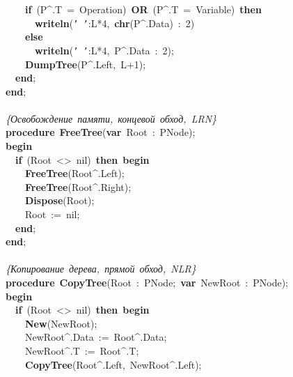 \mbox{}\ \ \ \ \textbf{if}\ (P\textasciicircum{}.T\ =\ Operation)\ \textbf{OR}\ (P\textasciicircum{}.T\ =\ Variable)\ \textbf{then} \\
\mbox{}\ \ \ \ \ \ \textbf{writeln}(\texttt{'\ '}:L*4,\ \textbf{chr}(P\textasciicircum{}.Data)\ :\ 2) \\
\mbox{}\ \ \ \ \textbf{else} \\
\mbox{}\ \ \ \ \ \ \textbf{writeln}(\texttt{'\ '}:L*4,\ P\textasciicircum{}.Data\ :\ 2); \\
\mbox{}\ \ \ \ \textbf{DumpTree}(P\textasciicircum{}.Left,\ L+1); \\
\mbox{}\ \ \textbf{end}; \\
\mbox{}\textbf{end}; \\
\mbox{} \\
\mbox{}\textit{\{Освобождение\ памяти,\ концевой\ обход,\ LRN\}} \\
\mbox{}\textbf{procedure}\ \textbf{FreeTree}(\textbf{var}\ Root\ :\ PNode); \\
\mbox{}\textbf{begin} \\
\mbox{}\ \ \textbf{if}\ (Root\ \textless{}\textgreater{}\ nil)\ \textbf{then}\ \textbf{begin} \\
\mbox{}\ \ \ \ \textbf{FreeTree}(Root\textasciicircum{}.Left); \\
\mbox{}\ \ \ \ \textbf{FreeTree}(Root\textasciicircum{}.Right); \\
\mbox{}\ \ \ \ \textbf{Dispose}(Root); \\
\mbox{}\ \ \ \ Root\ :=\ nil; \\
\mbox{}\ \ \textbf{end}; \\
\mbox{}\textbf{end}; \\
\mbox{} \\
\mbox{}\textit{\{Копирование\ дерева,\ прямой\ обход,\ NLR\}} \\
\mbox{}\textbf{procedure}\ \textbf{CopyTree}(Root\ :\ PNode;\ \textbf{var}\ NewRoot\ :\ PNode); \\
\mbox{}\textbf{begin} \\
\mbox{}\ \ \textbf{if}\ (Root\ \textless{}\textgreater{}\ nil)\ \textbf{then}\ \textbf{begin} \\
\mbox{}\ \ \ \ \textbf{New}(NewRoot); \\
\mbox{}\ \ \ \ NewRoot\textasciicircum{}.Data\ :=\ Root\textasciicircum{}.Data; \\
\mbox{}\ \ \ \ NewRoot\textasciicircum{}.T\ :=\ Root\textasciicircum{}.T; \\
\mbox{}\ \ \ \ \textbf{CopyTree}(Root\textasciicircum{}.Left,\ NewRoot\textasciicircum{}.Left); \\
